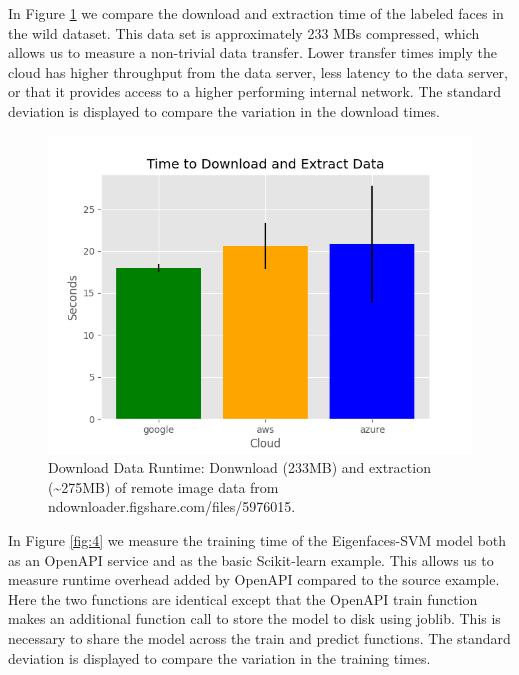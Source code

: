 In Figure \ref{fig:3} we compare the download and extraction time of the labeled
faces in the wild dataset. This data set is approximately 233 MBs
compressed, which allows us to measure a non-trivial data transfer.
Lower transfer times imply the cloud has higher throughput from the data
server, less latency to the data server, or that it provides access to a
higher performing internal network. The standard deviation is displayed
to compare the variation in the download times.

\begin{figure}
\centering
\includegraphics[width=\columnwidth]{../images/sample_graph_1.png}
\caption{Download Data Runtime:  Donwnload (233MB) and extraction
(\textasciitilde275MB) of remote image data from
ndownloader.figshare.com/files/5976015.}
\label{fig:3}
\end{figure}

In Figure \ref{fig:4} we measure the training time of the Eigenfaces-SVM model
both as an OpenAPI service and as the basic Scikit-learn example. This
allows us to measure runtime overhead added by OpenAPI compared to the
source example. Here the two functions are identical except that the
OpenAPI train function makes an additional function call to store the
model to disk using joblib. This is necessary to share the model across
the train and predict functions. The standard deviation is displayed to
compare the variation in the training times.

